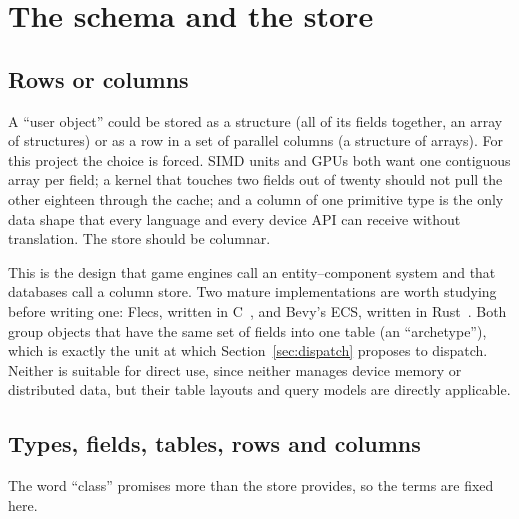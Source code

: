 \documentclass[11pt,a4paper]{article}
\begin{document}
\section{The schema and the store}
\label{sec:schema}

\subsection{Rows or columns}

A \enquote{user object} could be stored as a structure (all of its fields
together, an array of structures) or as a row in a set of parallel columns (a
structure of arrays).  For this project the choice is forced.  SIMD units and
GPUs both want one contiguous array per field; a kernel that touches two
fields out of twenty should not pull the other eighteen through the cache; and
a column of one primitive type is the only data shape that every language and
every device API can receive without translation.  The store should be
columnar.

This is the design that game engines call an entity--component system and
that databases call a column store.  Two mature implementations are worth
studying before writing one: Flecs, written in C~\cite{flecs}, and Bevy's
ECS, written in Rust~\cite{bevyecs}.  Both group objects that have the same
set of fields into one table (an \enquote{archetype}), which is exactly the
unit at which Section~\ref{sec:dispatch} proposes to dispatch.  Neither is
suitable for direct use, since neither manages device memory or distributed
data, but their table layouts and query models are directly applicable.

\subsection{Types, fields, tables, rows and columns}
\label{sec:vocab}

The word \enquote{class} promises more than the store provides, so the terms
are fixed here.
\end{document}
